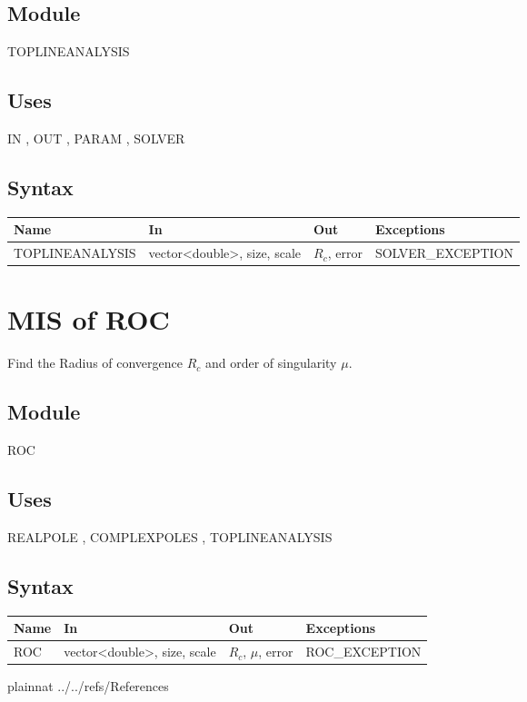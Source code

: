 \documentclass[12pt, titlepage]{article}
\begin{document}
\subsection{Module}

TOPLINEANALYSIS

\subsection{Uses}

IN , OUT , PARAM , SOLVER 

\subsection{Syntax}

\begin{tabular}{p{4cm} p{5cm} p{3cm} >{\raggedright\arraybackslash}p{5cm}}
\toprule
\textbf{Name} & \textbf{In} & \textbf{Out} & \textbf{Exceptions} \\
\midrule
  TOPLINEANALYSIS & vector<double>, size, scale &  $R_c$, error & SOLVER\_EXCEPTION \\
\bottomrule
\end{tabular}

\section{MIS of ROC} \label{sc:MIS_ROC}

Find the Radius of convergence $R_c$ and order of singularity $\mu$.

\subsection{Module}

ROC

\subsection{Uses}

REALPOLE ,
COMPLEXPOLES ,
TOPLINEANALYSIS 

\subsection{Syntax}

\begin{tabular}{p{3cm} p{5cm} p{3cm} >{\raggedright\arraybackslash}p{5cm}}
\toprule
\textbf{Name} & \textbf{In} & \textbf{Out} & \textbf{Exceptions} \\
\midrule
  ROC & vector<double>, size, scale &  $R_c$, $\mu$, error & ROC\_EXCEPTION \\
\bottomrule
\end{tabular}

 {plainnat}
 {../../refs/References}
\end{document}

